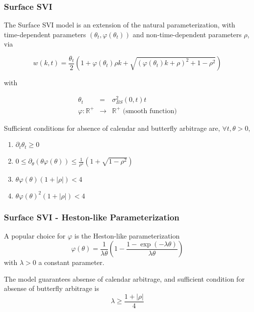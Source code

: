 \documentclass{amsart}
\theoremstyle{plain}
\numberwithin{equation}{section}
\begin{document}
\subsubsection{Surface SVI}\cite{Gatheral_2012}\label{sec:ssvi}

The Surface SVI model is an extension of the natural parameterization, with time-dependent parameters
$(\theta_t, \varphi(\theta_t))$ and non-time-dependent parameters $\rho$, via

\begin{equation}
w(k,t) = \frac{\theta_t}{2} \left( 1 + \varphi(\theta_t) \rho k + \sqrt{(\varphi(\theta_t) k + \rho)^2 + 1 - \rho^2} \right)
\end{equation}

with

\begin{eqnarray}
\theta_t &=& \sigma_{BS}^2(0,t) t \\
\varphi: \mathbb{R}^+ &\rightarrow& \mathbb{R}^+ \text{ (smooth function)}
\end{eqnarray}

Sufficient conditions for absence of calendar and butterfly arbitrage are, $\forall t, \theta > 0$,

\begin{enumerate}
\item $\partial_t \theta_t \ge 0$
\item $0 \le \partial_\theta (\theta \varphi(\theta)) \le \frac{1}{\rho^2} (1 + \sqrt{1 - \rho^2})$
\item $\theta \varphi(\theta) (1 + |\rho|) < 4$
\item $\theta \varphi(\theta)^2 (1 + |\rho|) < 4$
\end{enumerate}

\subsubsection{Surface SVI - Heston-like Parameterization}\label{sec:ssvi_heston}
A popular choice for $\varphi$ is the Heston-like parameterization
\begin{equation}
\varphi(\theta) = \frac{1}{\lambda \theta}(1 - \frac{1 - \exp(-\lambda \theta)}{\lambda \theta})  \end{equation}
with $\lambda > 0$ a constant parameter.

The model guarantees absense of calendar arbitrage, and sufficient condition for absense of butterfly arbitrage is
\begin{equation}
\lambda \ge \frac{1+|\rho|}{4}
\end{equation}
\end{document}

